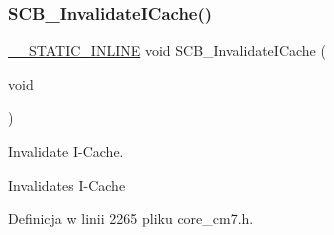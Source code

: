 \subsubsection{\texorpdfstring{S\+C\+B\+\_\+\+Invalidate\+I\+Cache()}{SCB\_InvalidateICache()}}
{\footnotesize\ttfamily \hyperlink{cmsis__iccarm_8h_aba87361bfad2ae52cfe2f40c1a1dbf9c}{\+\_\+\+\_\+\+S\+T\+A\+T\+I\+C\+\_\+\+I\+N\+L\+I\+NE} void S\+C\+B\+\_\+\+Invalidate\+I\+Cache (\begin{DoxyParamCaption}\item[{void}]{ }\end{DoxyParamCaption})}



Invalidate I-\/\+Cache. 

Invalidates I-\/\+Cache 

Definicja w linii 2265 pliku core\+\_\+cm7.\+h.

